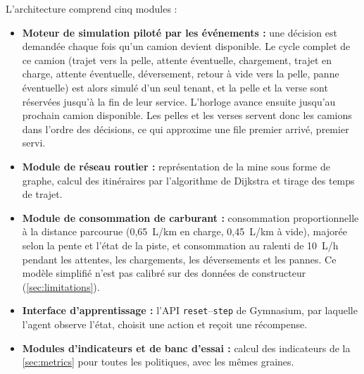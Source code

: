 \documentclass[11pt,a4paper]{article}
\newif\ifrevmarks
\newcommand{\revtag}[1]{\ifrevmarks\textsuperscript{\textcolor{red!70!black}{\scriptsize[#1]}}\fi}
\newenvironment{revbloc}[1]{\par\ifrevmarks\color{revcolor}\noindent\revtag{#1}\ \fi}{\par}
\newcommand{\afig}[1]{\ifrevmarks\textcolor{green!45!black}{\textbf{[FIGURE À RÉGÉNÉRER : #1]}}\fi}
\begin{document}
\afig{dans draw.io, corriger le module « Simulation Engine » (« Time-step haulage physics » devient « Event-driven cycle simulation ») et le module « Energy Consumption » (« Fuel use from power demand ; idling, uphill hauling, braking » devient « Distance-based fuel model with slope factor ; idling at 10 L/h »), pour rester cohérent avec le texte (M11).}

\begin{revbloc}{M11, A}
L'architecture comprend cinq modules :

\begin{itemize}
  \item \textbf{Moteur de simulation piloté par les événements :} une décision est demandée chaque fois qu'un camion devient disponible. Le cycle complet de ce camion (trajet vers la pelle, attente éventuelle, chargement, trajet en charge, attente éventuelle, déversement, retour à vide vers la pelle, panne éventuelle) est alors simulé d'un seul tenant, et la pelle et la verse sont réservées jusqu'à la fin de leur service. L'horloge avance ensuite jusqu'au prochain camion disponible. Les pelles et les verses servent donc les camions dans l'ordre des décisions, ce qui approxime une file premier arrivé, premier servi.
  \item \textbf{Module de réseau routier :} représentation de la mine sous forme de graphe, calcul des itinéraires par l'algorithme de Dijkstra et tirage des temps de trajet.
  \item \textbf{Module de consommation de carburant :} consommation proportionnelle à la distance parcourue (0,65~L/km en charge, 0,45~L/km à vide), majorée selon la pente et l'état de la piste, et consommation au ralenti de 10~L/h pendant les attentes, les chargements, les déversements et les pannes. Ce modèle simplifié n'est pas calibré sur des données de constructeur (\cref{sec:limitations}).
  \item \textbf{Interface d'apprentissage :} l'API \texttt{reset}--\texttt{step} de Gymnasium, par laquelle l'agent observe l'état, choisit une action et reçoit une récompense.
  \item \textbf{Modules d'indicateurs et de banc d'essai :} calcul des indicateurs de la \cref{sec:metrics} pour toutes les politiques, avec les mêmes graines.
\end{itemize}
\end{revbloc}
\end{document}
